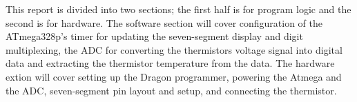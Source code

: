 \documentclass[main.tex]{subfiles}
\begin{document}
This report is divided into two sections; the first half is for program logic
and the second is for hardware. The software section will cover configuration
of the ATmega328p's timer for updating the seven-segment display and digit
multiplexing, the ADC for converting the thermistors voltage signal into
digital data and extracting the thermistor temperature from the data. The
hardware extion will cover setting up the Dragon programmer, powering the
Atmega and the ADC, seven-segment pin layout and setup, and connecting the
thermistor.
\end{document}
